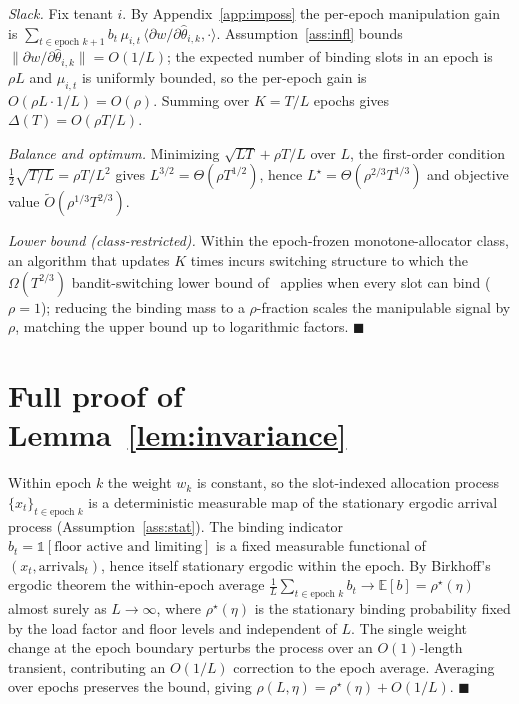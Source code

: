 \documentclass[conference]{IEEEtran}
\theoremstyle{definition}
\theoremstyle{remark}
\newcommand{\Slots}{T}
\newcommand{\Ep}{L}
\newcommand{\Neps}{K}
\newcommand{\rhobind}{\rho}
\newcommand{\load}{\eta}
\newcommand{\type}{\theta}
\newcommand{\alloc}{x}
\newcommand{\wt}{w}
\newcommand{\bindind}{b}
\newcommand{\Slack}{\Delta}
\newcommand{\Otil}{\tilde{O}}
\newcommand{\E}{\mathbb{E}}
\newcommand{\ind}{\mathbb{1}}
\begin{document}
\emph{Slack.} Fix tenant $i$. By Appendix~\ref{app:imposs} the per-epoch manipulation gain is $\sum_{t\in\text{epoch }k+1}\bindind_t\,\mu_{i,t}\,\langle\partial\wt/\partial\hat\type_{i,k},\cdot\rangle$. Assumption~\ref{ass:infl} bounds $\lVert\partial\wt/\partial\hat\type_{i,k}\rVert=O(1/\Ep)$; the expected number of binding slots in an epoch is $\rhobind\Ep$ and $\mu_{i,t}$ is uniformly bounded, so the per-epoch gain is $O(\rhobind\Ep\cdot1/\Ep)=O(\rhobind)$. Summing over $\Neps=\Slots/\Ep$ epochs gives $\Slack(\Slots)=O(\rhobind\Slots/\Ep)$.

\emph{Balance and optimum.} Minimizing $\sqrt{\Ep\Slots}+\rhobind\Slots/\Ep$ over $\Ep$, the first-order condition $\tfrac12\sqrt{\Slots/\Ep}=\rhobind\Slots/\Ep^{2}$ gives $\Ep^{3/2}=\Theta(\rhobind\Slots^{1/2})$, hence $\Ep^\star=\Theta(\rhobind^{2/3}\Slots^{1/3})$ and objective value $\Otil(\rhobind^{1/3}\Slots^{2/3})$.

\emph{Lower bound (class-restricted).} Within the epoch-frozen monotone-allocator class, an algorithm that updates $\Neps$ times incurs switching structure to which the $\Omega(\Slots^{2/3})$ bandit-switching lower bound of~\cite{ref:dekel} applies when every slot can bind ($\rhobind=1$); reducing the binding mass to a $\rhobind$-fraction scales the manipulable signal by $\rhobind$, matching the upper bound up to logarithmic factors. \hfill$\blacksquare$

\section{Full proof of Lemma~\ref{lem:invariance}}\label{app:invariance}
Within epoch $k$ the weight $\wt_k$ is constant, so the slot-indexed allocation process $\{\alloc_t\}_{t\in\text{epoch }k}$ is a deterministic measurable map of the stationary ergodic arrival process (Assumption~\ref{ass:stat}). The binding indicator $\bindind_t=\ind[\text{floor active and limiting}]$ is a fixed measurable functional of $(\alloc_t,\text{arrivals}_t)$, hence itself stationary ergodic within the epoch. By Birkhoff's ergodic theorem the within-epoch average $\tfrac1\Ep\sum_{t\in\text{epoch }k}\bindind_t\to\E[\bindind]=\rhobind^\star(\load)$ almost surely as $\Ep\to\infty$, where $\rhobind^\star(\load)$ is the stationary binding probability fixed by the load factor and floor levels and independent of $\Ep$. The single weight change at the epoch boundary perturbs the process over an $O(1)$-length transient, contributing an $O(1/\Ep)$ correction to the epoch average. Averaging over epochs preserves the bound, giving $\rhobind(\Ep,\load)=\rhobind^\star(\load)+O(1/\Ep)$. \hfill$\blacksquare$
\end{document}
